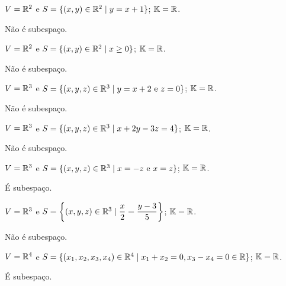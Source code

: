 \documentclass[12pt]{exam}
\begin{document}
\begin{exercicio}
	$V = \mathbb{R}^2$ e $S = \{(x, y) \in \mathbb{R}^2 \mid y = x + 1\}$; $\mathbb{K} = \mathbb{R}$.
	\begin{solucao}
		N\~ao \'e subespa\c{c}o.
	\end{solucao}
\end{exercicio}

\begin{exercicio}
	$V = \mathbb{R}^2$ e $S = \{(x, y) \in \mathbb{R}^2 \mid x \ge 0\}$; $\mathbb{K} = \mathbb{R}$.
	\begin{solucao}
		N\~ao \'e subespa\c{c}o.
	\end{solucao}
\end{exercicio}

\begin{exercicio}
	$V = \mathbb{R}^3$ e $S = \{(x, y, z) \in \mathbb{R}^3 \mid y = x + 2 \mbox{ e } z = 0\}$; $\mathbb{K} = \mathbb{R}$.
	\begin{solucao}
		N\~ao \'e subespa\c{c}o.
	\end{solucao}
\end{exercicio}

\begin{exercicio}
	$V = \mathbb{R}^3$ e $S = \{(x, y, z) \in \mathbb{R}^3 \mid x + 2y -3z = 4\}$; $\mathbb{K} = \mathbb{R}$.
	\begin{solucao}
		N\~ao \'e subespa\c{c}o.
	\end{solucao}
\end{exercicio}

\begin{exercicio}
	$V = \mathbb{R}^3$ e $S = \{(x, y, z) \in \mathbb{R}^3 \mid x = -z \mbox{ e } x = z\}$; $\mathbb{K} = \mathbb{R}$.
	\begin{solucao}
		\'E subespa\c{c}o.
	\end{solucao}
\end{exercicio}

\begin{exercicio}
	$V = \mathbb{R}^3$ e $S = \left\{(x, y, z) \in \mathbb{R}^3 \mid \dfrac{x}{2} = \dfrac{y - 3}{5}\right\}$; $\mathbb{K} = \mathbb{R}$.
	\begin{solucao}
		N\~ao \'e subespa\c{c}o.
	\end{solucao}
\end{exercicio}

\begin{exercicio}
	$V = \mathbb{R}^4$ e $S = \{(x_1, x_2, x_3, x_4) \in \mathbb{R}^4 \mid x_1 + x_2 = 0, x_3 - x_4 = 0 \in \mathbb{R}\}$; $\mathbb{K} = \mathbb{R}$.
	\begin{solucao}
		\'E subespa\c{c}o.
	\end{solucao}
\end{exercicio}
\end{document}
